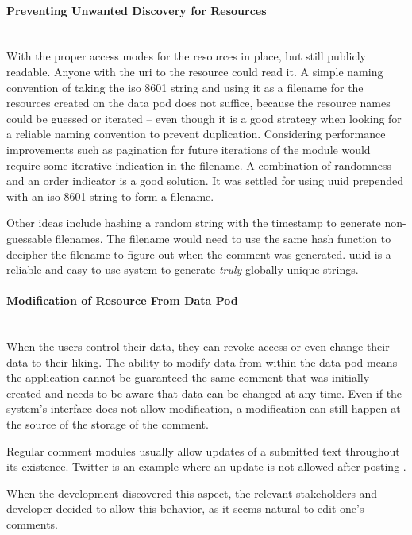 \paragraph{Preventing Unwanted Discovery for Resources}\mbox{}\\

With the proper access modes for the resources in place, but still publicly readable. Anyone with the \gls{uri} to the resource could read it. A simple naming convention of taking the \gls{iso} 8601 string and using it as a filename for the resources created on the data pod does not suffice, because the resource names could be guessed or iterated -- even though it is a good strategy when looking for a reliable naming convention to prevent duplication. 
Considering performance improvements such as pagination for future iterations of the module would require some iterative indication in the filename. A combination of randomness and an order indicator is a good solution. It was settled for using \gls{uuid} prepended with an \gls{iso} 8601 string to form a filename.

Other ideas include hashing a random string with the timestamp to generate non-guessable filenames. The filename would need to use the same hash function to decipher the filename to figure out when the comment was generated. \gls{uuid} is a reliable and easy-to-use system to generate \textit{truly} globally unique strings. 
\vspace{0.5cm}
\paragraph{Modification of Resource From Data Pod}\mbox{}\\

When the users control their data, they can revoke access or even change their data to their liking. The ability to modify data from within the data pod means the application cannot be guaranteed the same comment that was initially created and needs to be aware that data can be changed at any time. Even if the system's interface does not allow modification, a modification can still happen at the source of the storage of the comment.

Regular comment modules usually allow updates of a submitted text throughout its existence. Twitter is an example where an update is not allowed after posting \cite{twitter-edit}. 

When the development discovered this aspect, the relevant stakeholders and developer decided to allow this behavior, as it seems natural to edit one's comments.

